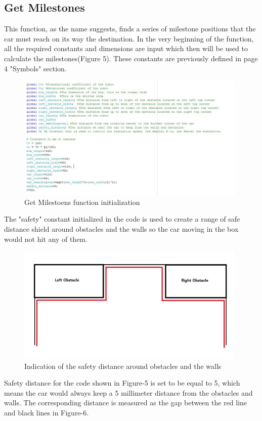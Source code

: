 \documentclass[12pt, letterpaper]{amsart} %
\numberwithin{equation}{section}
\begin{document}
\subsection{Get Milestones}
This function, as the name suggests, finds a series of milestone positions that the car must reach on its way the destination.
In the very beginning of the function, all the required constants and dimensions are input which then will be used to calculate the milestones(Figure 5). These constants are previously defined in page 4 "Symbols" section. 
\\
\begin{figure}[h!]
\includegraphics[width=110mm]{fig_5.png}
\caption{Get Milestoens function initialization}
\label{fig:figure5}
\end{figure}

The "safety" constant initialized in the code is used to create a range of safe distance shield around obstacles and the walls so the car moving in the box would not hit any of them. 

\begin{figure}[h!]
\includegraphics[width=110mm]{fig_6.png}
\caption{Indication of the safety distance around obstacles and the walls}
\label{fig:figure6}	
\end{figure}

\newpage
Safety distance for the code shown in Figure-5 is set
to be equal to 5, which means the car would always keep
a 5 millimeter distance from the obstacles and walls.
The corresponding distance is measured as the gap
between the red line and black lines in Figure-6.
\end{document}
